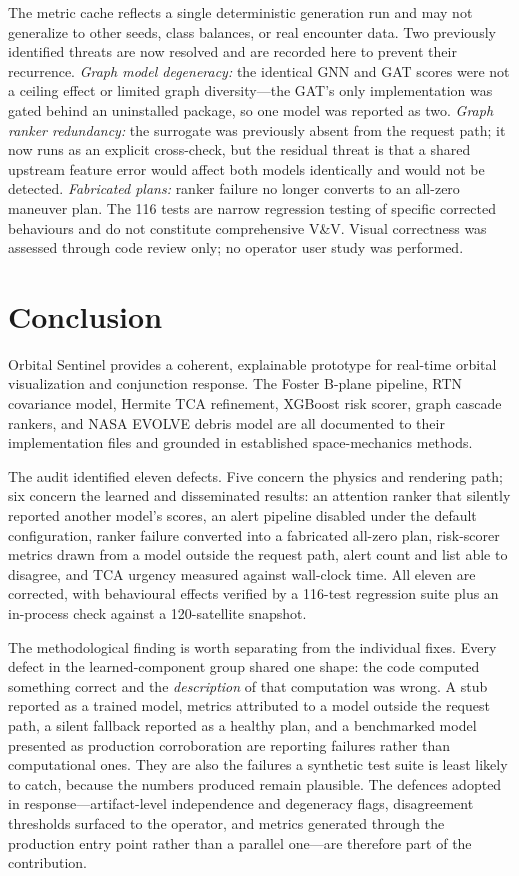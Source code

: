 \documentclass[conference]{IEEEtran}
\begin{document}
The metric cache reflects a single deterministic generation run and may not
generalize to other seeds, class balances, or real encounter data. Two previously
identified threats are now resolved and are recorded here to prevent their
recurrence. \emph{Graph model degeneracy:} the identical GNN and GAT scores were
not a ceiling effect or limited graph diversity---the GAT's only implementation
was gated behind an uninstalled package, so one model was reported as two.
\emph{Graph ranker redundancy:} the surrogate was previously absent from the
request path; it now runs as an explicit cross-check, but the residual threat is
that a shared upstream feature error would affect both models identically and
would not be detected. \emph{Fabricated plans:} ranker failure no longer
converts to an all-zero maneuver plan. The 116 tests are narrow regression testing
of specific corrected behaviours and do not constitute comprehensive V\&{}V.
Visual correctness was assessed through code review only; no operator user study
was performed.

\section{Conclusion}
\label{sec:conclusion}

Orbital Sentinel provides a coherent, explainable prototype for real-time
orbital visualization and conjunction response. The Foster B-plane pipeline,
RTN covariance model, Hermite TCA refinement, XGBoost risk scorer, graph cascade
rankers, and NASA EVOLVE debris model are all documented to their implementation
files and grounded in established space-mechanics methods.

The audit identified eleven defects. Five concern the physics and rendering
path; six concern the learned and disseminated results: an attention ranker that
silently reported another model's scores, an alert pipeline disabled under the
default configuration, ranker failure converted into a fabricated all-zero plan,
risk-scorer metrics drawn from a model outside the request path, alert count and
list able to disagree, and TCA urgency measured against wall-clock time. All
eleven are corrected, with behavioural effects verified by a 116-test regression
suite plus an in-process check against a 120-satellite snapshot.

The methodological finding is worth separating from the individual fixes. Every
defect in the learned-component group shared one shape: the code computed
something correct and the \emph{description} of that computation was wrong. A stub
reported as a trained model, metrics attributed to a model outside the request
path, a silent fallback reported as a healthy plan, and a benchmarked model
presented as production corroboration are reporting failures rather than
computational ones. They are also the failures a synthetic test suite is least
likely to catch, because the numbers produced remain plausible. The defences
adopted in response---artifact-level independence and degeneracy flags,
disagreement thresholds surfaced to the operator, and metrics generated through
the production entry point rather than a parallel one---are therefore part of the
contribution.
\end{document}
